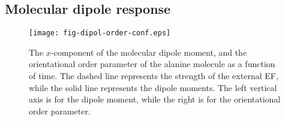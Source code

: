 \documentclass[a4paper,preprint,unsortedaddress,onecolumn]{revtex4-1}
\begin{document}


\subsection{Molecular dipole response}

\begin{figure}
  \centering
  \texttt{[image: fig-dipol-order-conf.eps]}
  \caption{The
    $x$-component of the molecular dipole moment, and the orientational order parameter
    of the alanine molecule as a
    function of time. The dashed line represents the strength of the
    external EF, while the solid line represents the dipole
    moments. The left vertical axis is for the dipole moment, while
    the right is for the orientational order parameter.
  }
  \label{fig:tmp3}
\end{figure}
\end{document}
